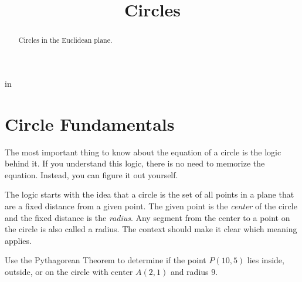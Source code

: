 \documentclass{ximera}
\title{Circles}
\newcommand{\pskip}{\vskip 0.1 in}
\begin{document}
\begin{abstract}
Circles in the Euclidean plane.
\end{abstract}
\maketitle


\pskip




\section*{Circle Fundamentals}

The most important thing to know about the equation of a circle is the logic behind it. If you understand this logic, there is no need to memorize the equation. Instead, you can figure it out yourself.

The logic starts with the idea that a circle is the set of all points in a plane that are a fixed distance from a given point. The given point is the \emph{center} of the circle and the fixed distance is the \emph{radius}. Any segment from the center to a point on the circle is also called a radius. The context should make it clear which meaning applies.




\begin{example} \label{Ex1}
Use the Pythagorean Theorem to determine if the point $P(10,5)$ lies inside, outside, or on the circle with center $A(2,1)$ and radius $9$. 
\end{example}
\end{document}

